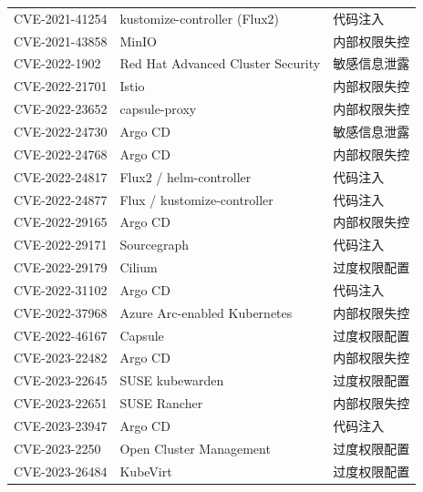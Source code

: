 \begin{longtable}{>{\centering\arraybackslash}p{3.6cm} >{\raggedright\arraybackslash}p{6.8cm} >{\centering\arraybackslash}p{2.8cm}}
CVE-2021-41254    & kustomize-controller (Flux2)                  & 代码注入         \\
CVE-2021-43858    & MinIO                                         & 内部权限失控     \\
CVE-2022-1902     & Red Hat Advanced Cluster Security             & 敏感信息泄露     \\
CVE-2022-21701    & Istio                                         & 内部权限失控     \\
CVE-2022-23652    & capsule-proxy                                 & 内部权限失控     \\
CVE-2022-24730    & Argo CD                                       & 敏感信息泄露     \\
CVE-2022-24768    & Argo CD                                       & 内部权限失控     \\
CVE-2022-24817    & Flux2 / helm-controller                       & 代码注入         \\
CVE-2022-24877    & Flux / kustomize-controller                   & 代码注入         \\
CVE-2022-29165    & Argo CD                                       & 内部权限失控     \\
CVE-2022-29171    & Sourcegraph                                   & 代码注入         \\
CVE-2022-29179    & Cilium                                        & 过度权限配置     \\
CVE-2022-31102    & Argo CD                                       & 代码注入         \\
CVE-2022-37968    & Azure Arc-enabled Kubernetes                  & 内部权限失控     \\
CVE-2022-46167    & Capsule                                       & 过度权限配置     \\
CVE-2023-22482    & Argo CD                                       & 内部权限失控     \\
CVE-2023-22645    & SUSE kubewarden                               & 过度权限配置     \\
CVE-2023-22651    & SUSE Rancher                                  & 内部权限失控     \\
CVE-2023-23947    & Argo CD                                       & 代码注入         \\
CVE-2023-2250     & Open Cluster Management                       & 过度权限配置     \\
CVE-2023-26484    & KubeVirt                                      & 过度权限配置     \\

\end{longtable}
